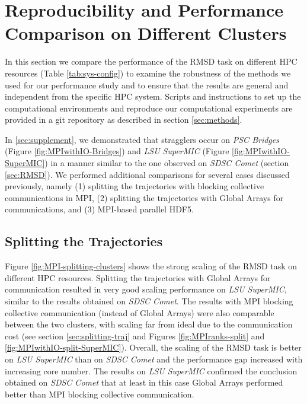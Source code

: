 
\section{Reproducibility and Performance Comparison on Different Clusters}
\label{sec:clusters}

In this section we compare the performance of the RMSD task on different HPC resources (Table \ref{tab:sys-config}) to examine the robustness of the methods we used for our performance study and to ensure that the results are general and independent from the specific HPC system.
Scripts and instructions to set up the computational environments and reproduce our computational experiments are provided in a git repository as described in section \ref{sec:methods}.

In \ref{sec:supplement}, we demonstrated that stragglers occur on \emph{PSC Bridges} (Figure \ref{fig:MPIwithIO-Bridges}) and \emph{LSU SuperMIC} (Figure \ref{fig:MPIwithIO-SuperMIC}) in a manner similar to the one observed on \emph{SDSC Comet} (section \ref{sec:RMSD}).
We performed additional comparisons for several cases discussed previously, namely (1) splitting the trajectories with blocking collective communications in MPI, (2) splitting the trajectories with Global Arrays for communications, and (3) MPI-based parallel HDF5.

\subsection{Splitting the Trajectories}
Figure \ref{fig:MPI-splitting-clusters} shows the strong scaling of the RMSD task on different HPC resources.  
Splitting the trajectories with Global Arrays for communication resulted in very good scaling performance on \emph{LSU SuperMIC}, similar to the results obtained on \emph{SDSC Comet}.
The results with MPI blocking collective communication (instead of Global Arrays) were also comparable between the two clusters, with scaling far from ideal due to the communication cost (see section \ref{sec:splitting-traj} and Figures \ref{fig:MPIranks-split} and \ref{fig:MPIwithIO-split-SuperMIC}). 
Overall, the scaling of the RMSD task is better on \emph{LSU SuperMIC} than on \emph{SDSC Comet} and the performance gap increased with increasing core number.
The results on \emph{LSU SuperMIC} confirmed the conclusion obtained on \emph{SDSC Comet} that at least in this case Global Arrays performed better than MPI blocking collective communication.

